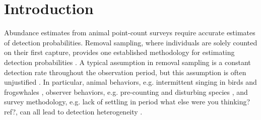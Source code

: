 \documentclass[useAMS,usenatbib,referee,12pt]{article}
\newcommand{\adam}[1]{{\color{blue} ADAM: #1}}
\newcommand{\jarad}[1]{{\color{Orange} #1}}
\begin{document}
\newpage
\section{Introduction}\label{sec:intro}

Abundance estimates from animal point-count surveys require accurate estimates of detection probabilities.  
Removal sampling, where individuals are solely counted on their first capture, provides one established methodology for estimating detection probabilities \citep{Farnsworth2002}.
A typical assumption in removal sampling is a constant detection rate throughout the observation period, but this assumption is often unjustified \citep{Alldredge2007}. %
In particular, animal behaviors, e.g. intermittent singing in birds and frogswhales \citep{Scott2005, Diefenbach2007, Reidy2011}, observer behaviors, e.g. pre-counting and disturbing species \citep{McSheaRappole1997, Rosenstock2002, Alldredge2007, LeeMarsden2008, Johnson2008}, and survey methodology, e.g. lack of settling in period \jarad{what else were you thinking? ref?}, can all lead to detection heterogeneity \citep{Farnsworth2005}.
\end{document}
